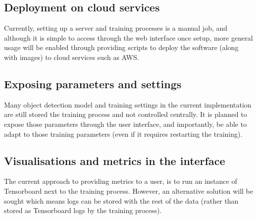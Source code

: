 \subsection {Deployment on cloud services}
Currently, setting up a server and training processes is a manual job, and although it is simple to access through the web interface once setup, more general usage will be enabled through providing scripts to deploy the software (along with images) to cloud services such as \gls{AWS}. 

\subsection {Exposing parameters and settings}
 Many object detection model and training settings in the current implementation are still stored the training process and not controlled centrally. It is planned to expose those parameters through the user interface, and importantly, be able to adapt to those training parameters (even if it requires restarting the training).

\subsection{Visualisations and metrics in the interface}

The current approach to providing metrics to a user, is to run an instance of Tensorboard next to the training process. However, an alternative solution will be sought which means logs can be stored with the rest of the data (rather than stored as Tensorboard logs by the training process).

